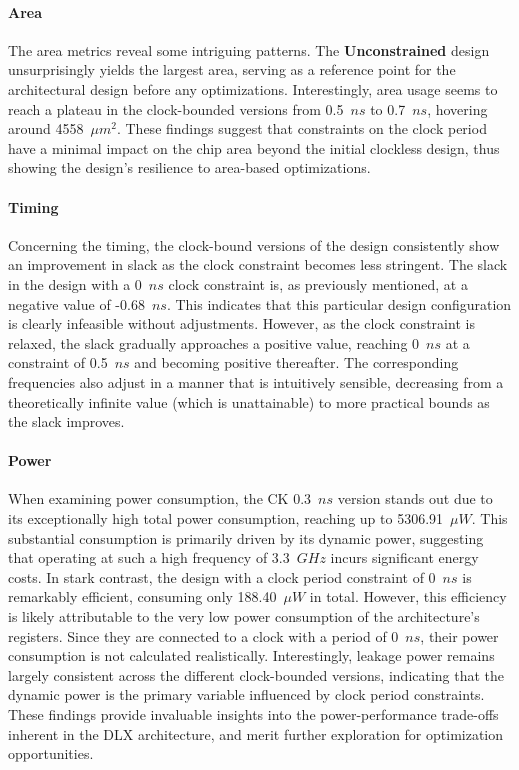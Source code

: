 \paragraph{Area}
The area metrics reveal some intriguing patterns. The \textbf{Unconstrained} design unsurprisingly yields the largest area, serving as a reference point for the architectural design before any optimizations. Interestingly, area usage seems to reach a plateau in the clock-bounded versions from 0.5~$ns$ to 0.7~$ns$, hovering around 4558~$\mu m^{2}$. These findings suggest that constraints on the clock period have a minimal impact on the chip area beyond the initial clockless design, thus showing the design's resilience to area-based optimizations.

\paragraph{Timing}
Concerning the timing, the clock-bound versions of the design consistently show an improvement in slack as the clock constraint becomes less stringent. The slack in the design with a 0~$ns$ clock constraint is, as previously mentioned, at a negative value of -0.68~$ns$. This indicates that this particular design configuration is clearly infeasible without adjustments. However, as the clock constraint is relaxed, the slack gradually approaches a positive value, reaching 0~$ns$ at a constraint of 0.5~$ns$ and becoming positive thereafter. The corresponding frequencies also adjust in a manner that is intuitively sensible, decreasing from a theoretically infinite value (which is unattainable) to more practical bounds as the slack improves.

\paragraph{Power}
When examining power consumption, the CK 0.3~$ns$ version stands out due to its exceptionally high total power consumption, reaching up to 5306.91~$\mu W$. This substantial consumption is primarily driven by its dynamic power, suggesting that operating at such a high frequency of 3.3~$GHz$ incurs significant energy costs. In stark contrast, the design with a clock period constraint of 0~$ns$ is remarkably efficient, consuming only 188.40~$\mu W$ in total. However, this efficiency is likely attributable to the very low power consumption of the architecture's registers. Since they are connected to a clock with a period of 0~$ns$, their power consumption is not calculated realistically. Interestingly, leakage power remains largely consistent across the different clock-bounded versions, indicating that the dynamic power is the primary variable influenced by clock period constraints. These findings provide invaluable insights into the power-performance trade-offs inherent in the DLX architecture, and merit further exploration for optimization opportunities.

